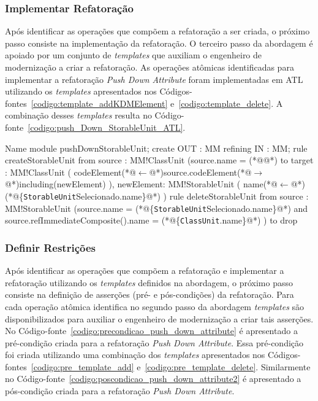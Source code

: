 \subsubsection{Implementar Refatoração}

Após identificar as operações que compõem a refatoração a ser criada, o próximo passo consiste na implementação da refatoração. O terceiro passo da abordagem é apoiado por um conjunto de \textit{templates} que auxiliam o engenheiro de modernização a criar a refatoração. As operações atômicas identificadas para implementar a refatoração \textit{Push Down Attribute} foram implementadas em ATL utilizando os \textit{templates} apresentados nos Códigos-fontes~\ref{codigo:template_addKDMElement} e~\ref{codigo:template_delete}. A combinação desses \textit{templates} resulta no Código-fonte~\ref{codigo:push_Down_StorableUnit_ATL}.


\begin{codigo}[caption={[ATL representando a refatoração \textit{Push Down Attribute}.] ATL da refatoração \textit{Push Down Attribute}.},escapeinside={(*@}{@*)}, basicstyle=\footnotesize, label={codigo:push_Down_StorableUnit_ATL}, language=ATL]{Name}
module pushDownStorableUnit;
create OUT : MM refining IN : MM;
rule createStorableUnit {
	from
		source : MM!ClassUnit (source.name = (*@@*)
	to 
		target : MM!ClassUnit (
			codeElement(*@$\leftarrow$@*)source.codeElement(*@$\rightarrow$@*)including(newElement)
		),
		newElement: MM!StorableUnit (
			name(*@$\leftarrow$@*)(*@\{\texttt{StorableUnit}Selecionado.name\}@*)
		)
}
rule deleteStorableUnit {
	from
		source : MM!StorableUnit (source.name = (*@\{\texttt{StorableUnit}Selecionado.name\}@*) and source.refImmediateComposite().name = (*@\{\texttt{ClassUnit}.name\}@*) )
	to
		drop
}
\end{codigo}

\subsubsection{Definir Restrições}

Após identificar as operações que compõem a refatoração e implementar a refatoração utilizando os \textit{templates} definidos na abordagem, o próximo passo consiste na definição de asserções (pré- e pós-condições) da refatoração. Para cada operação atômica identifica no segundo passo da abordagem \textit{templates} são disponibilizados para auxiliar o engenheiro de modernização a criar tais asserções. No Código-fonte~\ref{codigo:precondicao_push_down_attribute} é apresentado a pré-condição criada para a refatoração \textit{Push Down Attribute}. Essa pré-condição foi criada utilizando uma combinação dos \textit{templates} apresentados nos Códigos-fontes~\ref{codigo:pre_template_add} e~\ref{codigo:pre_template_delete}. Similarmente no Código-fonte~\ref{codigo:poscondicao_push_down_attribute2} é apresentado a pós-condição criada para a refatoração \textit{Push Down Attribute}.


